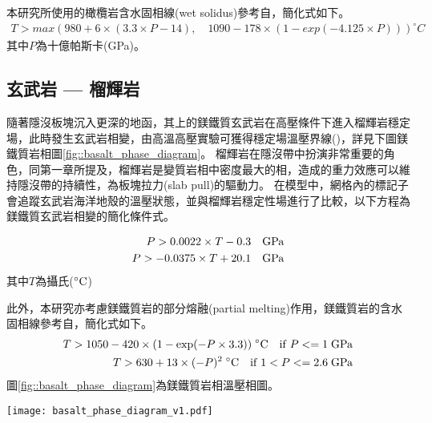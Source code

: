 本研究所使用的橄欖岩含水固相線(wet solidus)參考自\citet{katz2003new}，簡化式如下。
\begin{align}
    T > max (980+6\times (3.3 \times P-14) ,\quad 1090-178\times(1-exp(-4.125\times P))) ^\circ C 
\end{align}
其中$P$為十億帕斯卡(GPa)。

\subsection{玄武岩 --- 榴輝岩}

隨著隱沒板塊沉入更深的地函，其上的鎂鐵質玄武岩在高壓條件下進入榴輝岩穩定場，此時發生玄武岩相變，由高溫高壓實驗可獲得穩定場溫壓界線(\citealp{Hacker2003})，詳見下圖鎂鐵質岩相圖\ref{fig::basalt_phase_diagram}。
榴輝岩在隱沒帶中扮演非常重要的角色，同第一章所提及，榴輝岩是變質岩相中密度最大的相，造成的重力效應可以維持隱沒帶的持續性，為板塊拉力(slab pull)的驅動力。
在模型中，網格內的標記子會追蹤玄武岩海洋地殼的溫壓狀態，並與榴輝岩穩定性場進行了比較，以下方程為鎂鐵質玄武岩相變的簡化條件式。

\begin{align}
    P > 0.0022 \times T -0.3  \quad {\rm GPa}\\
    P > -0.0375 \times T + 20.1  \quad {\rm GPa}
\end{align}
其中$T$為攝氏(${\rm ^\circ C}$)

此外，本研究亦考慮鎂鐵質岩的部分熔融(partial melting)作用，鎂鐵質岩的含水固相線參考自\citet{Gutscher2000Bcan}，簡化式如下。
\begin{align}
    T > 1050-420 \times (1-{\rm exp}(-P\times 3.3)) \; {\rm ^\circ C} \quad {\rm if} \; P <= 1 \; {\rm GPa}\\
    T > 630 + 13 \times (-P)^2\; {\rm ^\circ C} \quad {\rm if} \; 1 < P <= 2.6 \; {\rm GPa}
\end{align}
圖\ref{fig::basalt_phase_diagram}為鎂鐵質岩相溫壓相圖。
\begin{figure*}[ht!]
    \centering
    \texttt{[image: basalt\_phase\_diagram\_v1.pdf]}
    \caption[鎂鐵質岩相圖，參考自\citet{Hacker2003}與\citet{Gutscher2000Bcan}]{鎂鐵質岩相圖，綠線隔開玄武岩與榴輝岩的穩定場，參考自\citet{Hacker2003}，橘線為鎂鐵質岩的含水固相線，參考自\citet{Gutscher2000Bcan}，綠虛線為外插值。}
    \label{fig::basalt_phase_diagram}
\end{figure*}


